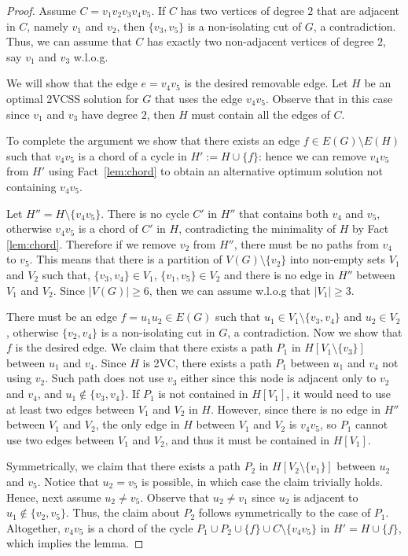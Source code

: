 \documentclass{theoretics}
\begin{document}
\begin{proof}
    Assume $C=v_1v_2v_3v_4v_5$.
    If $C$ has two vertices of degree $2$ that are adjacent in $C$, namely $v_1$ and $v_2$, then $\{v_3,v_5\}$ is a non-isolating cut of $G$, a contradiction. Thus, we can assume that $C$ has exactly two non-adjacent vertices of degree $2$, say $v_1$ and $v_3$ w.l.o.g. 
    
    We will show that the edge $e=v_4v_5$ is the desired removable edge. Let $H$ be an optimal 2VCSS solution for $G$ that uses the edge $v_4v_5$. Observe that in this case since $v_1$ and $v_3$ have degree $2$, then $H$ must contain all the edges of $C$.
    
    To complete the argument we show that there exists an edge $f\in E(G)\setminus E(H)$ such that $v_4v_5$ is a chord of a cycle in $H':=H\cup\{f\}$: hence we can remove $v_4v_5$ from $H'$     
    using Fact~\ref{lem:chord} 
    to obtain an alternative optimum solution not containing $v_4v_5$. 
    
    Let $H''=H\setminus\{v_4v_5\}$. There is no cycle $C'$ in $H''$ that contains both $v_4$ and $v_5$, otherwise $v_4v_5$ is a chord of $C'$ in $H$, contradicting the minimality of $H$ by Fact \ref{lem:chord}. Therefore if we remove $v_2$ from $H''$, there must be no paths from $v_4$ to $v_5$. This means that there is a partition of $V(G)\setminus\{v_2\}$ into non-empty sets $V_1$ and $V_2$ such that, $\{v_3,v_4\}\in V_1$, $\{v_1,v_5\}\in V_2$ and there is no edge in $H''$ between $V_1$ and $V_2$.  Since $|V(G)|\ge 6$, then we can assume w.l.o.g that $|V_1|\ge3$.
    
    There must be an edge $f=u_1u_2\in E(G)$ such that $u_1\in V_1\setminus\{v_3, v_4\}$ and $u_2 \in V_2$, otherwise  $\{v_2,v_4\}$ is a non-isolating cut in $G$, a contradiction. 
    Now we show that $f$ is the desired edge. We claim that there exists a path $P_1$ in $H[V_1\setminus \{v_3\}]$ between $u_1$ and $v_4$. Since $H$ is 2VC, there exists a path $P_1$ between $u_1$ and $v_4$ not using $v_2$. Such path does not use $v_3$ either since this node is adjacent only to $v_2$ and $v_4$, and $u_1\notin \{v_3,v_4\}$. If $P_1$ is not contained in $H[V_1]$, it would need to use at least two edges between $V_1$ and $V_2$ in $H$. However, since there is no edge in $H''$ between $V_1$ and $V_2$, the only edge in $H$ between $V_1$ and $V_2$ is $v_4v_5$, so $P_1$ cannot use two edges between $V_1$ and $V_2$, and thus it must be contained in $H[V_1]$.
    
    Symmetrically, we claim that there exists a path $P_2$ in $H[V_2\setminus \{v_1\}]$ between $u_2$ and $v_5$. Notice that $u_2=v_5$ is possible, in which case the claim trivially holds. Hence, next assume $u_2\neq v_5$. Observe that $u_2\neq v_1$ since $u_2$ is adjacent to $u_1\notin \{v_2,v_5\}$. Thus, the claim about $P_2$ follows symmetrically to the case of $P_1$. Altogether, $v_4v_5$ is a chord of the cycle $P_1\cup P_2 \cup \{f\} \cup C \setminus\{v_4v_5\}$ in $H'=H\cup\{f\}$, which implies the lemma.
\end{proof}
\end{document}
